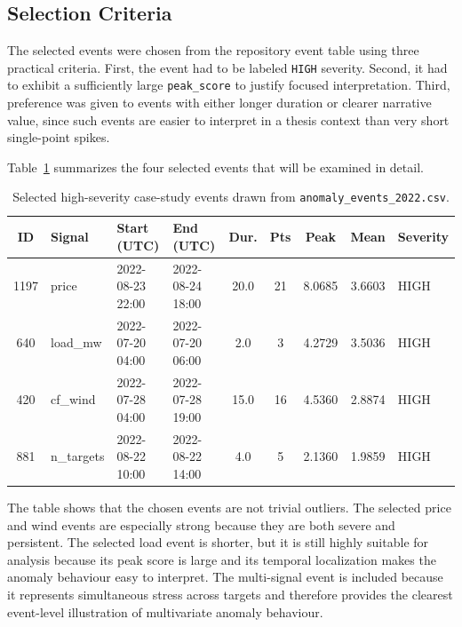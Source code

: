 \subsection{Selection Criteria}

The selected events were chosen from the repository event table using three practical criteria. First, the event had to be labeled \texttt{HIGH} severity. Second, it had to exhibit a sufficiently large \texttt{peak\_score} to justify focused interpretation. Third, preference was given to events with either longer duration or clearer narrative value, since such events are easier to interpret in a thesis context than very short single-point spikes.

Table~\ref{tab:selected_high_severity_events} summarizes the four selected events that will be examined in detail.

\FloatBarrier
\begin{table}[H]
	\centering
	\caption{Selected high-severity case-study events drawn from \texttt{anomaly\_events\_2022.csv}.}
	\label{tab:selected_high_severity_events}
	\scriptsize
	\setlength{\tabcolsep}{7pt}
	\renewcommand{\arraystretch}{1.15}
	\begin{tabular}{|c|p{1.35cm}|p{2.0cm}|p{2.0cm}|c|c|c|c|p{1.1cm}|}
		\hline
		\textbf{ID} & \textbf{Signal} & \centering\textbf{Start (UTC)} & \centering\textbf{End (UTC)} & \textbf{Dur.} & \textbf{Pts} & \textbf{Peak} & \textbf{Mean} & \centering\textbf{Severity} \tabularnewline
		\hline
		1197 & price     & 2022-08-23 22:00 & 2022-08-24 18:00 & 20.0 & 21 & 8.0685 & 3.6603 & HIGH \\
		\hline
		640  & load\_mw  & 2022-07-20 04:00 & 2022-07-20 06:00 & 2.0  & 3  & 4.2729 & 3.5036 & HIGH \\
		\hline
		420  & cf\_wind  & 2022-07-28 04:00 & 2022-07-28 19:00 & 15.0 & 16 & 4.5360 & 2.8874 & HIGH \\
		\hline
		881  & n\_targets& 2022-08-22 10:00 & 2022-08-22 14:00 & 4.0  & 5  & 2.1360 & 1.9859 & HIGH \\
		\hline
	\end{tabular}
\end{table}
\FloatBarrier

The table shows that the chosen events are not trivial outliers. The selected price and wind events are especially strong because they are both severe and persistent. The selected load event is shorter, but it is still highly suitable for analysis because its peak score is large and its temporal localization makes the anomaly behaviour easy to interpret. The multi-signal event is included because it represents simultaneous stress across targets and therefore provides the clearest event-level illustration of multivariate anomaly behaviour.

